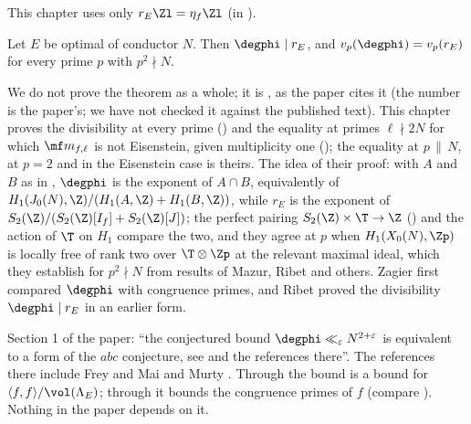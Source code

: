 This chapter uses only $r_E\Zl=\eta_f\Zl$ (in ).

\begin{theorem}\label{thm:moddeg:ars}
Let $E$ be optimal of conductor $N$. Then $\degphi\mid r_E$, and $v_p(\degphi)=v_p(r_E)$ for every prime $p$ with $p^2\nmid N$.
\end{theorem}

We do not prove the theorem as a whole; it is \cite[Theorem 2.2]{ARS12}, as the paper cites it (the number is the paper's; we have not checked it against the published
text). This chapter proves the divisibility at every prime () and the equality at primes $\ell\nmid2N$ for which $\mf m_{f,\ell}$ is not Eisenstein, given
multiplicity one (); the equality at $p\,\|\,N$, at $p=2$ and in the Eisenstein case is theirs. The idea of their proof: with $A$ and $B$ as in
, $\degphi$ is the exponent of $A\cap B$, equivalently of $H_1(J_0(N),\Z)/(H_1(A,\Z)+H_1(B,\Z))$, while $r_E$ is the exponent of
$S_2(\Z)/(S_2(\Z)[I_f]+S_2(\Z)[J])$; the perfect pairing $S_2(\Z)\times\T\to\Z$ () and the action of $\T$ on $H_1$ compare the two, and they agree at $p$ when $H_1(X_0(N),\Zp)$ is
locally free of rank two over $\T\otimes\Zp$ at the relevant maximal ideal, which they establish for $p^2\nmid N$ from results of Mazur, Ribet and others. Zagier \cite{Zagier85} first
compared $\degphi$ with congruence primes, and Ribet \cite{Ribet83} proved the divisibility $\degphi\mid r_E$ in an earlier form.

\begin{remark}\label{rem:moddeg:abc-size}
Section 1 of the paper: ``the conjectured bound $\degphi\ll_\varepsilon N^{2+\varepsilon}$ is equivalent to a form of the $abc$ conjecture, see \cite[\S2]{ARS12} and the references there''. The
references there include Frey \cite{Frey} and Mai and Murty \cite{MaiMurty}. Through  the bound is a bound for $\langle f,f\rangle/\vol(\Lambda_E)$; through
 it bounds the congruence primes of $f$ (compare \cite{Murty99}). Nothing in the paper depends on it.
\end{remark}

